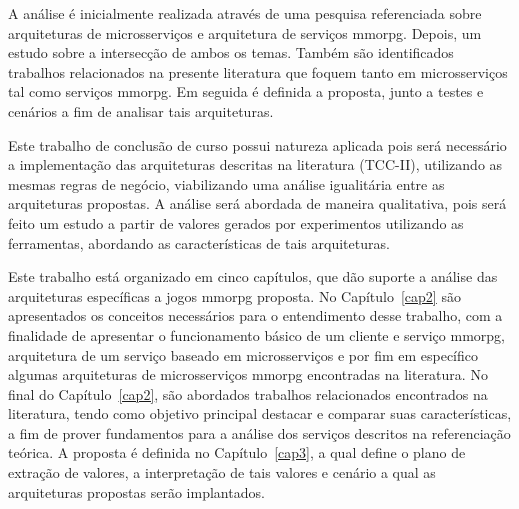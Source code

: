 A análise é inicialmente realizada através de uma pesquisa referenciada sobre arquiteturas de microsserviços e arquitetura de serviços \ac{mmorpg}.
%
Depois, um estudo sobre a intersecção de ambos os temas.
%
Também são identificados trabalhos relacionados na presente literatura que foquem tanto em microsserviços tal como serviços \ac{mmorpg}.
%
Em seguida é definida a proposta, junto a testes e cenários a fim de analisar tais arquiteturas. 



Este trabalho de conclusão de curso possui natureza aplicada pois será necessário a implementação das arquiteturas descritas na literatura (TCC-II), utilizando as mesmas regras de negócio, viabilizando uma análise igualitária entre as arquiteturas propostas.
%
A análise será abordada de maneira qualitativa, pois será feito um estudo a partir de valores gerados por experimentos utilizando as ferramentas, abordando as características de tais arquiteturas.



Este trabalho está organizado em cinco capítulos, que dão suporte a análise das arquiteturas específicas a jogos \ac{mmorpg} proposta.
%
No Capítulo~\ref{cap2} são apresentados os conceitos necessários para o entendimento desse trabalho, com a finalidade de apresentar o funcionamento básico de um cliente e serviço \ac{mmorpg}, arquitetura de um serviço baseado em microsserviços e por fim em específico algumas arquiteturas de microsserviços \ac{mmorpg} encontradas na literatura.
%
No final do Capítulo~\ref{cap2}, são abordados trabalhos relacionados encontrados na literatura, tendo como objetivo principal destacar e comparar suas características, a fim de prover fundamentos para a análise dos serviços descritos na referenciação teórica.
%
A proposta é definida no Capítulo~\ref{cap3}, a qual define o plano de extração de valores, a interpretação de tais valores e cenário a qual as arquiteturas propostas serão implantados.
%
